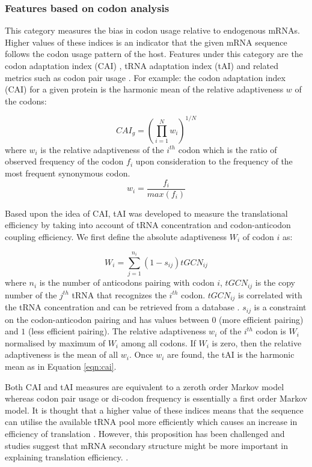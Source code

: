 

\subsubsection{Features based on codon analysis}
This category measures the bias in codon usage relative  to endogenous mRNAs. Higher values of these indices is an indicator that the given mRNA sequence follows the codon usage pattern of the host. Features under this category are the codon adaptation index (CAI) \cite{Sharp1987-ed}, tRNA adaptation index (tAI) \cite{ Reis2004-dl, Sabi2014-je} and related metrics such as codon pair usage \cite{Gutman1989-pn}. For example: the codon adaptation index (CAI) for a given protein is the harmonic mean of the relative adaptiveness $w$ \cite{Sharp1987-ed} of the codons:

\begin{equation}
CAI_{g}=(\prod_{i=1}^{N} w_i)^{1/N}
\label{eqn:cai}
\end{equation}
where $w_i$ is the relative adaptiveness of the $i^{th}$ codon which is the ratio of observed frequency of the codon $f_i$ upon consideration to the frequency of the most frequent synonymous codon. $$w_i = \frac{f_i}{max(f_i)}$$ 

Based upon the idea of CAI, tAI was developed to measure the translational efficiency by taking into account of tRNA concentration and codon-anticodon coupling efficiency. We first define the absolute adaptiveness $W_i$ of codon $i$ as:

\begin{equation}
W_i = \sum_{j=1}^{n_i} (1 - s_{ij})tGCN_{ij}
\end{equation}
where $n_i$ is the number of anticodons pairing with codon $i$, $tGCN_{ij}$ is the copy number of the $j^{th}$ tRNA that recognizes the $i^{th}$ codon. $tGCN_{ij}$ is correlated with the tRNA concentration and can be retrieved from a database \cite{kanaya1999studies, novoa2012role}. $s_{ij}$ is a constraint on the codon-anticodon pairing and has values between $0$ (more efficient pairing) and $1$ (less efficient pairing). The relative adaptiveness $w_i$ of the $i^{th}$ codon is  $W_i$ normalised by maximum of $W_i$ among all codons. If $W_i$ is zero, then the relative adaptiveness is the mean of all $w_i$. Once $w_i$ are found, the tAI is the harmonic mean as in Equation \ref{eqn:cai}. 


Both CAI and tAI measures are equivalent to a zeroth order Markov model whereas codon pair usage or di-codon frequency is essentially a first order Markov model. It is thought that a higher value of these indices means that the sequence can utilise the available tRNA pool more efficiently which causes an increase in efficiency of translation \cite{ikemura1985codon, Gutman1989-pn, Sharp1987-ed, Reis2004-dl, Sabi2014-je, Brule2017-mx}. However, this proposition has been challenged and studies suggest that mRNA secondary structure might be more important in explaining translation efficiency.  \cite{Kudla2009-tl, Boel2016-jd, Cambray2018-kn}.